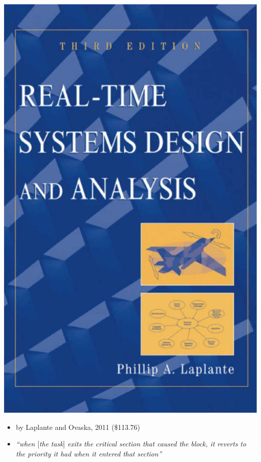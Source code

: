 \documentclass[dvipsnames,14pt,t]{beamer}
\begin{document}
  \begin{frame}[c]

  \begin{center}
  \includegraphics[scale=0.15]{pics/p1.jpg}
  \end{center}

  \begin{itemize}
  \item by Laplante and Ovaska, 2011 (\$113.76)
  \item \it ``when $[$the task$]$ exits the critical section that
        caused the block, it reverts to the priority it had
        when it entered that section'' 
  \end{itemize}

  \end{frame}
  
\end{document}
